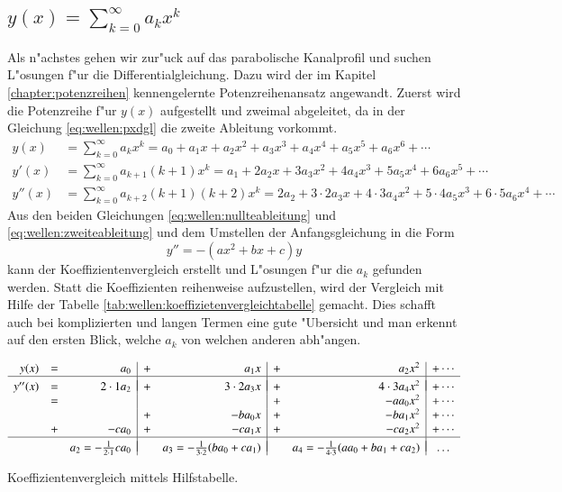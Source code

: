 \subsection{\texorpdfstring{$y(x) = \sum_{k = 0}^{\infty} a_{k}x^k$}{y(x) = 
summe k = 0 bis unendlich ak xk}}
\label{subsec:wellen:Potenzreihenansatz}

Als n"achstes gehen wir zur"uck auf das parabolische Kanalprofil und suchen 
L"osungen f"ur die Differentialgleichung. Dazu wird der im Kapitel 
\ref{chapter:potenzreihen} kennengelernte Potenzreihenansatz angewandt.
Zuerst wird die Potenzreihe f"ur $y(x)$ aufgestellt und zweimal abgeleitet, da 
in der Gleichung \eqref{eq:wellen:pxdgl} die zweite Ableitung vorkommt.
\begin{align}
	y(x)
	&=
	\sum_{k = 0}^{\infty} a_{k}x^k
	=
	a_0 + a_1x + a_2x^2 + a_3x^3 + a_4x^4 + a_5x^5 + a_6x^6 + \dotsb
	\label{eq:wellen:nullteableitung}
	\\
	y'(x)
	&=
	\sum_{k=0}^{\infty} a_{k+1}(k+1)x^k
	=
	a_1 + 2a_2x + 3a_3x^2 + 4a_4x^3 + 5a_5x^4 + 6a_6x^5+ \dotsb
	\\
	y''(x)
	&=
	\sum_{k = 0}^{\infty} a_{k+2}(k+1)(k+2)x^k
	=
	2a_2 + 3 \mathbin{\cdot} 2a_3x + 4 \mathbin{\cdot} 3a_4x^2 + 5 
	\mathbin{\cdot} 4a_5x^3 + 6 \mathbin{\cdot} 5a_6x^4 + \dotsb
	\label{eq:wellen:zweiteableitung}
\end{align}
Aus den beiden Gleichungen \eqref{eq:wellen:nullteableitung} und
\eqref{eq:wellen:zweiteableitung} und dem Umstellen der Anfangsgleichung in die 
Form
\begin{equation*}
	y'' = -(ax^2+bx+c)y
\end{equation*}
kann der Koeffizientenvergleich erstellt und L"osungen f"ur die $a_k$ gefunden 
werden. Statt die Koeffizienten reihenweise aufzustellen, wird der Vergleich 
mit Hilfe der Tabelle \ref{tab:wellen:koeffizietenvergleichtabelle} gemacht. 
Dies schafft auch bei komplizierten und langen Termen eine gute "Ubersicht und 
man erkennt auf den ersten Blick, welche $a_k$ von welchen anderen abh"angen.
\begin{table}
	\centering
	\begin{equation*}
		\begin{array}{r c r | c r | c r | c r c}
		y(x) & = &
		a_0 & + & a_1x & + & a_2x^2 & + \dotsb
		\\
		\hline&&&&&&&\\[-2ex]
		y''(x) & = &
		2\cdot1 a_2 & + & 3\cdot2 a_3x & + & 4\cdot3 a_4x^2 & + \dotsb
		\\
		& = &
		& & & + &- aa_0x^2 & + \dotsb
		\\
		& &
		& + &- ba_0x & + &- ba_1x^2 & + \dotsb
		\\
		& + &
		-ca_0 & + &- ca_1x & + &- ca_2x^2 & + \dotsb
		\\
		\hline&&&&&&&\\[-2ex]
		& &
		a_2 = -\frac{1}{2 \cdot 1}ca_0
		& & a_3 = -\frac{1}{3 \cdot 2}(ba_0+ca_1)
		& & a_4 = -\frac{1}{4 \cdot 3}(aa_0+ba_1+ca_2)
		& \dots
		\end{array}
	\end{equation*}
	\caption{Koeffizientenvergleich mittels Hilfstabelle.}
	\label{tab:wellen:koeffizietenvergleichtabelle}
\end{table}

